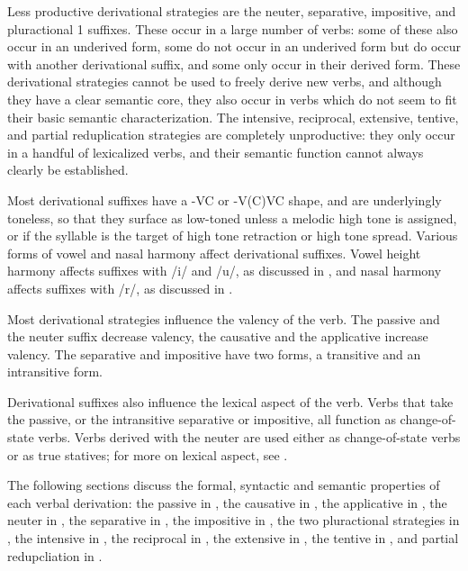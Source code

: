 Less productive derivational strategies are the neuter, separative, impositive, and pluractional 1 suffixes. These occur in a large number of verbs: some of these also occur in an underived form, some do not occur in an underived form but do occur with another derivational suffix, and some only occur in their derived form. These derivational strategies cannot be used to freely derive new verbs, and although they have a clear semantic core, they also occur in verbs which do not seem to fit their basic semantic characterization. The intensive, reciprocal, extensive, tentive, and partial reduplication strategies are completely unproductive: they only occur in a handful of lexicalized verbs, and their semantic function cannot always clearly be established.

Most derivational suffixes have a -VC or -V(C)VC shape, and are underlyingly toneless, so that they surface as low-toned unless a melodic high tone is assigned, or if the syllable is the target of high tone retraction or high tone spread. Various forms of vowel and nasal harmony affect derivational suffixes. Vowel height harmony affects suffixes with /i/ and /u/, as discussed in , and nasal harmony affects suffixes with /r/, as discussed in .

Most derivational strategies influence the valency of the verb. The passive and the neuter suffix decrease valency, the causative and the applicative increase valency. The separative and impositive have two forms, a transitive and an intransitive form.

\begin{sloppypar}
Derivational suffixes also influence the lexical aspect of the verb. Verbs that take the passive, or the intransitive separative or impositive, all function as change-of-state verbs. Verbs derived with the neuter are used either as change-of-state verbs or as true statives; for more on lexical aspect, see .
\end{sloppypar}

The following sections discuss the formal, syntactic and semantic properties of each verbal derivation: the passive in , the causative in , the applicative in , the neuter in , the separative in , the impositive in , the two pluractional strategies in , the intensive in , the reciprocal in , the extensive in , the tentive in , and partial redupcliation in .

